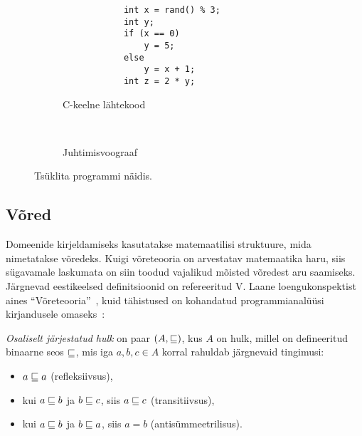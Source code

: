 \documentclass[../thesis.tex]{subfiles}
\begin{document}
\begin{figure}
	\centering
	\begin{subfigure}[b]{0.4\textwidth}
		\centering
		\begin{verbatim}
			int x = rand() % 3;
			int y;
			if (x == 0)
				y = 5;
			else
				y = x + 1;
			int z = 2 * y;
		\end{verbatim}
		\caption{C-keelne lähtekood}
	\end{subfigure}
	~
	\begin{subfigure}[b]{0.4\textwidth}
		\centering
		\caption{Juhtimisvoograaf}
	\end{subfigure}

	\caption{Tsüklita programmi näidis.}
	\label{fig:prog-if}
\end{figure}


\subsection{Võred}
Domeenide kirjeldamiseks kasutatakse matemaatilisi struktuure, mida nimetatakse võredeks. Kuigi võreteooria on arvestatav matemaatika haru, siis sügavamale laskumata on siin toodud vajalikud mõisted võredest aru saamiseks.
Järgnevad eestikeelsed definitsioonid on refereeritud V. Laane loengukonspektist aines \enquote{Võreteooria}~\cite{laan_voreteooria}, kuid tähistused on kohandatud programmianalüüsi kirjandusele omaseks~\cite[17]{seidl_foundations}:

\begin{definition}
\label{def:järjestatud_hulk}
\emph{Osaliselt järjestatud hulk} on paar $(A, \sqsubseteq)$, kus $A$ on hulk, millel on defineeritud binaarne seos $\sqsubseteq$, mis iga $a, b, c \in A$ korral rahuldab järgnevaid tingimusi:
\begin{itemize}[nosep]
	\item $a \sqsubseteq a$ (refleksiivsus),
	\item kui $a \sqsubseteq b$ ja $b \sqsubseteq c$, siis $a \sqsubseteq c$ (transitiivsus),
	\item kui $a \sqsubseteq b$ ja $b \sqsubseteq a$, siis $a = b$ (antisümmeetrilisus).
\end{itemize}
\end{definition}
\end{document}
